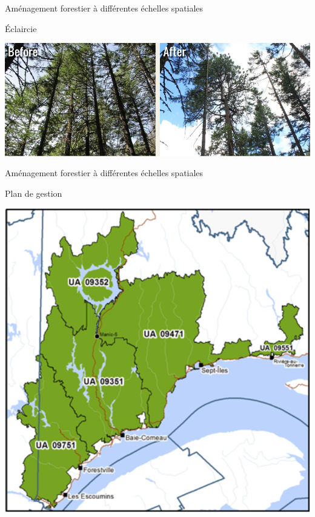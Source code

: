 \documentclass[11pt, compress, aspectratio=1610]{beamer}
\begin{document}
\begin{frame}{Aménagement forestier à différentes échelles spatiales}

Éclaircie

\centering
 \includegraphics[scale=0.338]{figures/thinning}\par

\end{frame}

\begin{frame}{Aménagement forestier à différentes échelles spatiales}

Plan de gestion

\centering
 \includegraphics[scale=0.28]{figures/planGestion}\par

\end{frame}
\end{document}
